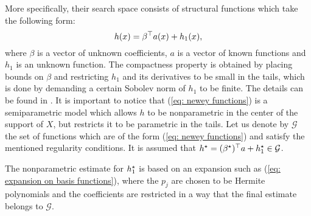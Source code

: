 More specifically, their search space consists of structural functions which take the following form:
\begin{equation}
    \label{eq: newey functions}
    h ( x ) = \beta^{ \top } a ( x ) + h_{ 1 } ( x )
,\end{equation}
where $ \beta $ is a vector of unknown coefficients, $ a $ is a vector of known functions and $ h_{ 1 } $ is an unknown function.
The compactness property is obtained by placing bounds on $ \beta $ and restricting $ h_{ 1 } $ and its derivatives to be small in the tails, which is done by demanding a certain Sobolev norm of $ h_{ 1 } $ to be finite.
The details can be found in \cite{newey2003}.
It is important to notice that (\ref{eq: newey functions}) is a semiparametric model which allows $ h $ to be nonparametric in the center of the support of $ X $, but restricts it to be parametric in the tails.
Let us denote by $ \mathcal{G} $ the set of functions which are of the form (\ref{eq: newey functions}) and satisfy the mentioned regularity conditions.
It is assumed that $ h^{ \star } = ( \beta^{ \star } )^{ \top } a + h^{ \star }_{ 1 }  \in \mathcal{G} $.

The nonparametric estimate for $ h^{ \star }_{ 1 } $ is based on an expansion such as (\ref{eq: expansion on basis functions}), where the $ p_{ j } $ are chosen to be Hermite polynomials and the coefficients are restricted in a way that the final estimate belongs to $ \mathcal{G} $.

